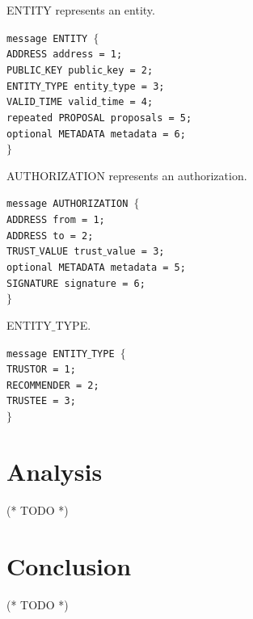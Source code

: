 \documentclass{article}
\begin{document}
ENTITY represents an entity.


\noindent \texttt{message ENTITY $\{$\\
\hspace*{2.ex} ADDRESS address = 1;\\
\hspace*{2.ex} PUBLIC$\_$KEY public$\_$key = 2;\\
\hspace*{2.ex} ENTITY$\_$TYPE entity$\_$type = 3;\\
\hspace*{2.ex} VALID$\_$TIME valid$\_$time = 4;\\
\hspace*{2.ex} repeated PROPOSAL proposals = 5;\\
\hspace*{2.ex} optional METADATA metadata = 6;\\
$\}$}

AUTHORIZATION represents an authorization.


\noindent \texttt{message AUTHORIZATION $\{$\\
\hspace*{2.ex} ADDRESS from = 1;\\
\hspace*{2.ex} ADDRESS to = 2;\\
\hspace*{2.ex} TRUST$\_$VALUE trust$\_$value = 3;\\
\hspace*{2.ex} optional METADATA metadata = 5;\\
\hspace*{2.ex} SIGNATURE signature = 6;\\
$\}$}

ENTITY$\_$TYPE.


\noindent \texttt{message ENTITY$\_$TYPE $\{$\\
\hspace*{2.ex} TRUSTOR = 1;\\
\hspace*{2.ex} RECOMMENDER = 2;\\
\hspace*{2.ex} TRUSTEE = 3;\\
$\}$}


\section{Analysis}

(* TODO *)


\section{Conclusion}

(* TODO *)
\end{document}
